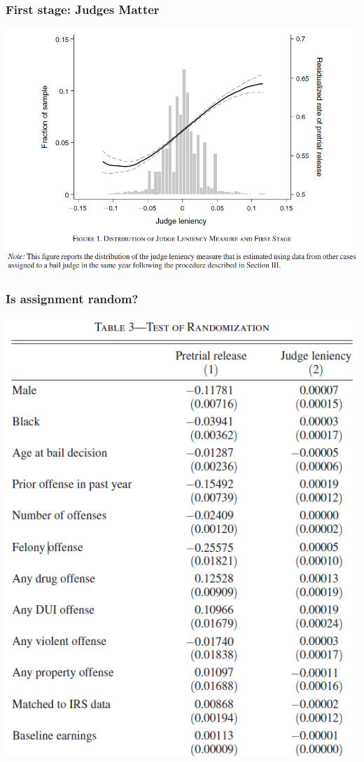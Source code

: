 \begin{frame}
  \frametitle{First stage: Judges Matter}
  \begin{center}
    \includegraphics[height=.8\textheight]{./resources/DobbieFirstStageGraph}
  \end{center}  
\end{frame}

\begin{frame}
  \frametitle{Is assignment random?}
  \begin{center}
    \includegraphics[height=.8\textheight]{./resources/DobbieRandomization}
  \end{center}  
\end{frame}

